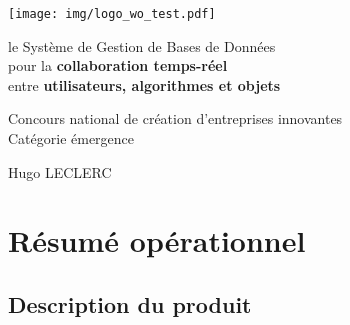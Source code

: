 \documentclass[a4paper,10pt]{scrreprt}
\begin{document}
\thispagestyle{empty}


\hspace{2cm}
\vspace{2cm}

\begin{center}
    \texttt{[image: img/logo\_wo\_test.pdf]}
    \vspace{3cm}
    
    \sffamily
    \huge
    le Système de Gestion de Bases de Données \\ pour la \textbf{\color{MSBlue}collaboration temps-réel} \\ entre \textbf{\color{MSLightBlue}utilisateurs, algorithmes et objets}

    \vspace{2cm}
    \Large
    Concours national de création d’entreprises innovantes\\Catégorie émergence
    
    \vspace{0.5cm}
    \Large
    Hugo LECLERC
    
    \vfill
    
\end{center}

\restoregeometry

\chapter*{Résumé opérationnel}

    \section*{Description du produit}
    
\end{document}
